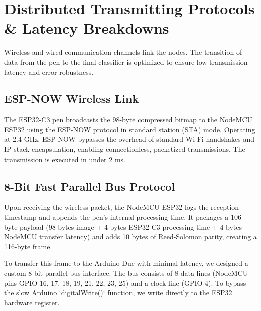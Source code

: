 \documentclass[12pt,a4paper]{article}
\begin{document}
\section{Distributed Transmitting Protocols \& Latency Breakdowns}
Wireless and wired communication channels link the nodes. The transition of data from the pen to the final classifier is optimized to ensure low transmission latency and error robustness.

\subsection{ESP-NOW Wireless Link}
The ESP32-C3 pen broadcasts the 98-byte compressed bitmap to the NodeMCU ESP32 using the ESP-NOW protocol in standard station (STA) mode. Operating at 2.4 GHz, ESP-NOW bypasses the overhead of standard Wi-Fi handshakes and IP stack encapsulation, enabling connectionless, packetized transmissions. The transmission is executed in under $2$ ms.

\subsection{8-Bit Fast Parallel Bus Protocol}
Upon receiving the wireless packet, the NodeMCU ESP32 logs the reception timestamp and appends the pen's internal processing time. It packages a $106$-byte payload (98 bytes image + 4 bytes ESP32-C3 processing time + 4 bytes NodeMCU transfer latency) and adds 10 bytes of Reed-Solomon parity, creating a 116-byte frame.

To transfer this frame to the Arduino Due with minimal latency, we designed a custom 8-bit parallel bus interface. The bus consists of 8 data lines (NodeMCU pins GPIO 16, 17, 18, 19, 21, 22, 23, 25) and a clock line (GPIO 4). To bypass the slow Arduino `digitalWrite()` function, we write directly to the ESP32 hardware register. 
\end{document}
